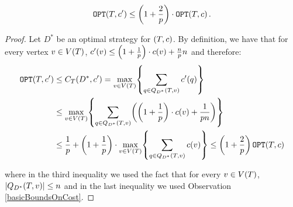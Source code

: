 \begin{lemma}\label{rounded_dt_lemma}
    $$
    \OPT\br{T,c'}\leq \br{1+\frac{2}{p}}\cdot \OPT\br{T,c}.
    $$
    \begin{proof}
        Let $D^*$ be an optimal strategy for $\br{T,c}$. By definition, we have that for every vertex $v\in V\br{T}$, $c'\br{v}\leq \br{1+\frac{1}{p}}\cdot c\br{v}+\frac{n}{p}n$ and therefore:
        \begin{align*}
            \OPT\br{T, c'}&\leq \COST_{T}\br{D^*,c'}=\max_{v\in V\br{T}}\brc{\sum_{q\in Q_{D^*}\br{T,v}}c'\br{q}}
            \\&
            \leq \max_{v\in V\br{T}}\brc{\sum_{q\in Q_{D^*}\br{T,v}}\br{\br{1+\frac{1}{p}}\cdot c\br{v}+\frac{1}{pn}}}
            \\&
            \leq \frac{1}{p}+\br{1+\frac{1}{p}}\cdot \max_{v\in V\br{T}}\brc{\sum_{q\in Q_{D^*}\br{T,v}}c\br{v} }\leq \br{1+\frac{2}{p}}\OPT\br{T,c}
        \end{align*}

        where in the third inequality we used the fact that for every $v\in V\br{T}$, $\spr{Q_{D^*}\br{T,v}}\leq n$ and in the last inequality we used Observation \ref{basicBoundsOnCost}.
    \end{proof}
\end{lemma}

